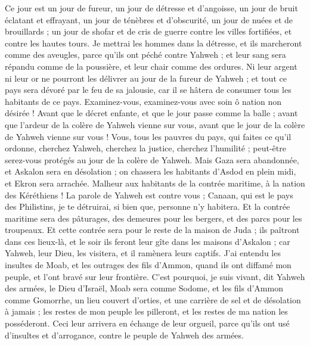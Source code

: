 \begin{multicols}{2}
Ce jour est un jour de fureur, un jour de détresse et d'angoisse, un jour de bruit éclatant et effrayant, un jour de ténèbres et d'obscurité, un jour de nuées et de brouillards ;
un jour de shofar et de cris de guerre contre les villes fortifiées, et contre les hautes tours.
Je mettrai les hommes dans la détresse, et ils marcheront comme des aveugles, parce qu'ils ont péché contre Yahweh ; et leur sang sera répandu comme de la poussière, et leur chair comme des ordures.
Ni leur argent ni leur or ne pourront les délivrer au jour de la fureur de Yahweh ; et tout ce pays sera dévoré par le feu de sa jalousie, car il se hâtera de consumer tous les habitants de ce pays.
\VerseOne{}Examinez-vous, examinez-vous avec soin ô nation non désirée !
Avant que le décret enfante, et que le jour passe comme la balle ; avant que l'ardeur de la colère de Yahweh vienne sur vous, avant que le jour de la colère de Yahweh vienne sur vous !
Vous, tous les pauvres du pays, qui faites ce qu'il ordonne, cherchez Yahweh, cherchez la justice, cherchez l'humilité ; peut-être serez-vous protégés au jour de la colère de Yahweh.
Mais Gaza sera abandonnée, et Askalon sera en désolation ; on chassera les habitants d'Asdod en plein midi, et Ekron sera arrachée.
Malheur aux habitants de la contrée maritime, à la nation des Kéréthiens ! La parole de Yahweh est contre vous ; Canaan, qui est le pays des Philistins, je te détruirai, si bien que, personne n'y habitera.
Et la contrée maritime sera des pâturages, des demeures pour les bergers, et des parcs pour les troupeaux.
Et cette contrée sera pour le reste de la maison de Juda ; ils paîtront dans ces lieux-là, et le soir ils feront leur gîte dans les maisons d'Askalon ; car Yahweh, leur Dieu, les visitera, et il ramènera leurs captifs.
J'ai entendu les insultes de Moab, et les outrages des fils d'Ammon, quand ils ont diffamé mon peuple, et l'ont bravé sur leur frontière.
C'est pourquoi, je suis vivant, dit Yahweh des armées, le Dieu d'Israël, Moab sera comme Sodome, et les fils d'Ammon comme Gomorrhe, un lieu couvert d'orties, et une carrière de sel et de désolation à jamais ; les restes de mon peuple les pilleront, et les restes de ma nation les posséderont.
Ceci leur arrivera en échange de leur orgueil, parce qu'ils ont usé d'insultes et d'arrogance, contre le peuple de Yahweh des armées.

\end{multicols}
